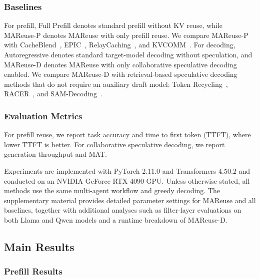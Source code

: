 \documentclass[letterpaper]{article} %
\begin{document}
\subsubsection{Baselines}
For prefill, Full Prefill denotes standard prefill without KV reuse, while MAReuse-P denotes MAReuse with only prefill reuse. We compare MAReuse-P with CacheBlend~\citep{DBLP:conf/eurosys/YaoLLRCZD0J25}, EPIC~\citep{DBLP:conf/icml/HuHWWHZFCS025}, RelayCaching~\citep{DBLP:journals/corr/abs-2603-13289}, and KVCOMM~\citep{DBLP:journals/corr/abs-2510-12872}. For decoding, Autoregressive denotes standard target-model decoding without speculation, and MAReuse-D denotes MAReuse with only collaborative speculative decoding enabled. We compare MAReuse-D with retrieval-based speculative decoding methods that do not require an auxiliary draft model: Token Recycling~\citep{DBLP:conf/acl/LuoWZZZ0X25}, RACER~\citep{DBLP:conf/acl/ZhangLZWZ26}, and SAM-Decoding~\citep{DBLP:conf/acl/HuWZZLCZ25}.

\subsubsection{Evaluation Metrics}
For prefill reuse, we report task accuracy and time to first token (TTFT), where lower TTFT is better. For collaborative speculative decoding, we report generation throughput and MAT.


 Experiments are implemented with PyTorch 2.11.0 and Transformers 4.50.2 and conducted on an NVIDIA GeForce RTX 4090 GPU. Unless otherwise stated, all methods use the same multi-agent workflow and greedy decoding. The supplementary material provides detailed parameter settings for MAReuse and all baselines, together with additional analyses such as filter-layer evaluations on both Llama and Qwen models and a runtime breakdown of MAReuse-D.

\subsection{Main Results}

\subsubsection{Prefill Results}
\end{document}
